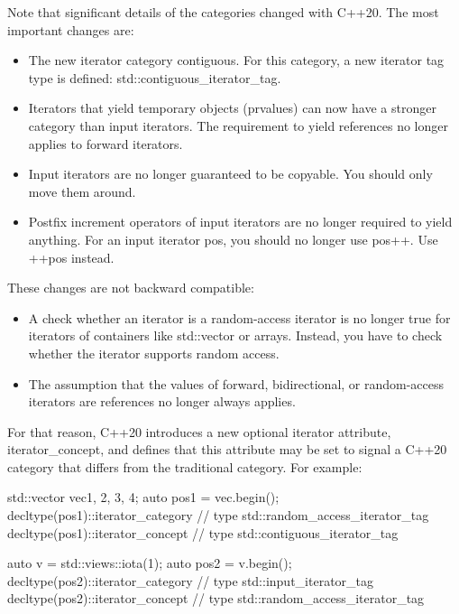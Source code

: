 Note that significant details of the categories changed with C++20. The most important changes are:

\begin{itemize}
\item
The new iterator category contiguous. For this category, a new iterator tag type is defined: std::contiguous\_iterator\_tag.

\item
Iterators that yield temporary objects (prvalues) can now have a stronger category than input iterators. The requirement to yield references no longer applies to forward iterators.

\item
Input iterators are no longer guaranteed to be copyable. You should only move them around.

\item
Postfix increment operators of input iterators are no longer required to yield anything. For an input iterator pos, you should no longer use pos++. Use ++pos instead.
\end{itemize}

These changes are not backward compatible:

\begin{itemize}
\item
A check whether an iterator is a random-access iterator is no longer true for iterators of containers like std::vector or arrays. Instead, you have to check whether the iterator supports random access.

\item
The assumption that the values of forward, bidirectional, or random-access iterators are references no longer always applies.
\end{itemize}

For that reason, C++20 introduces a new optional iterator attribute, iterator\_concept, and defines that this attribute may be set to signal a C++20 category that differs from the traditional category. For example:

\begin{cpp}
std::vector vec{1, 2, 3, 4};
auto pos1 = vec.begin();
decltype(pos1)::iterator_category // type std::random_access_iterator_tag
decltype(pos1)::iterator_concept // type std::contiguous_iterator_tag

auto v = std::views::iota(1);
auto pos2 = v.begin();
decltype(pos2)::iterator_category // type std::input_iterator_tag
decltype(pos2)::iterator_concept // type std::random_access_iterator_tag
\end{cpp}

